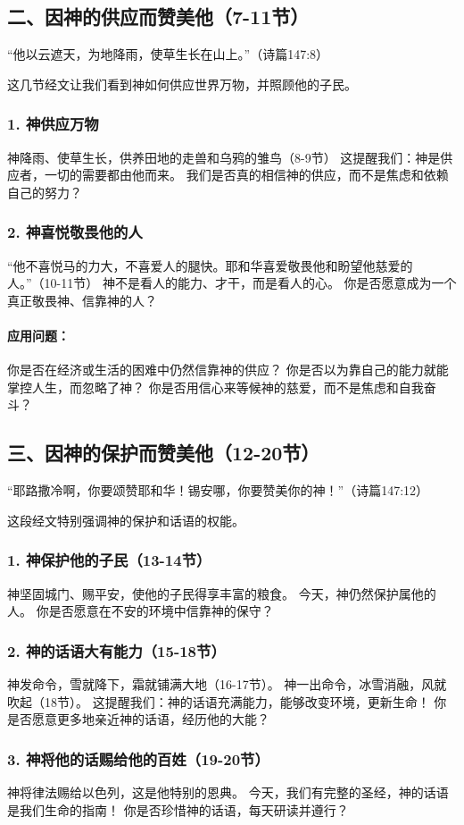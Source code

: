 \documentclass[a4paper, 12pt]{article}
\begin{document}
\subsection*{二、因神的供应而赞美他（7-11节）}
“他以云遮天，为地降雨，使草生长在山上。”（诗篇147:8）

这几节经文让我们看到神如何供应世界万物，并照顾他的子民。

\subsubsection*{1. 神供应万物}
神降雨、使草生长，供养田地的走兽和乌鸦的雏鸟（8-9节）
这提醒我们：神是供应者，一切的需要都由他而来。
我们是否真的相信神的供应，而不是焦虑和依赖自己的努力？
\subsubsection*{2. 神喜悦敬畏他的人}
“他不喜悦马的力大，不喜爱人的腿快。耶和华喜爱敬畏他和盼望他慈爱的人。”（10-11节）
神不是看人的能力、才干，而是看人的心。
你是否愿意成为一个真正敬畏神、信靠神的人？
\paragraph*{应用问题：}
你是否在经济或生活的困难中仍然信靠神的供应？
你是否以为靠自己的能力就能掌控人生，而忽略了神？
你是否用信心来等候神的慈爱，而不是焦虑和自我奋斗？
\subsection*{三、因神的保护而赞美他（12-20节）}
“耶路撒冷啊，你要颂赞耶和华！锡安哪，你要赞美你的神！”（诗篇147:12）

这段经文特别强调神的保护和话语的权能。

\subsubsection*{1. 神保护他的子民（13-14节）}
神坚固城门、赐平安，使他的子民得享丰富的粮食。
今天，神仍然保护属他的人。 你是否愿意在不安的环境中信靠神的保守？
\subsubsection*{2. 神的话语大有能力（15-18节）}
神发命令，雪就降下，霜就铺满大地（16-17节）。
神一出命令，冰雪消融，风就吹起（18节）。
这提醒我们：神的话语充满能力，能够改变环境，更新生命！
你是否愿意更多地亲近神的话语，经历他的大能？
\subsubsection*{3. 神将他的话赐给他的百姓（19-20节）}
神将律法赐给以色列，这是他特别的恩典。
今天，我们有完整的圣经，神的话语是我们生命的指南！
你是否珍惜神的话语，每天研读并遵行？
\end{document}
